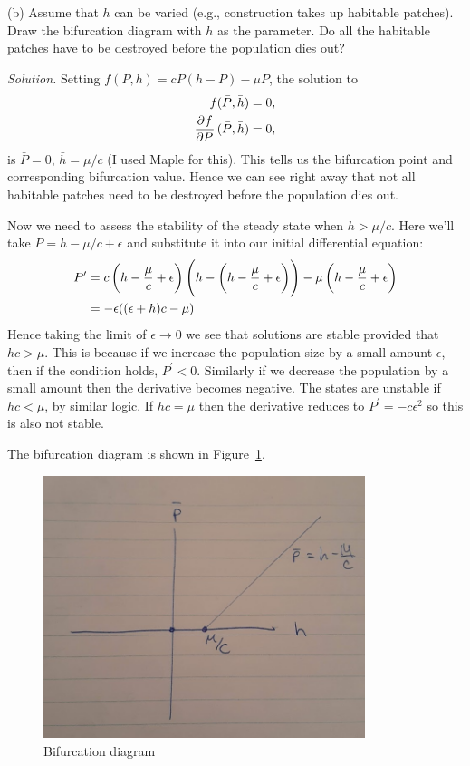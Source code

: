 \documentclass{article}
\begin{document}
\vspace{5mm}

(b) Assume that $h$ can be varied (e.g., construction takes up habitable
patches). Draw the bifurcation diagram with $h$ as the parameter. Do all
the habitable patches have to be destroyed before the population dies
out?

\textit{Solution.}
Setting $f(P, h) = c P (h - P) - \mu P$, the solution to
%
\begin{align*}
    f(\bar{P}, \bar{h}) &= 0, \\
    \dpd{f}{P}(\bar{P}, \bar{h}) &= 0,
\end{align*}
%
is $\bar{P} = 0$, $\bar{h} = \mu / c$ (I used Maple for this).
This tells us the bifurcation point and corresponding bifurcation value.
Hence we can see right away that not all habitable patches need to be destroyed
before the population dies out.

Now we need to assess the stability of the steady state when $h > \mu /
c$. Here we'll take $P = h - \mu / c + \epsilon$ and substitute it into
our initial differential equation:
%
\begin{align*}
    P^\prime
        &=
        c \del{h - \frac{\mu}{c}+ \epsilon}
        \del{h - \del{h - \frac{\mu}{c} + \epsilon}}
        - \mu \del{h - \frac{\mu}{c} + \epsilon} \\
        &= - \epsilon ((\epsilon + h) c - \mu)
\end{align*}
%
Hence taking the limit of $\epsilon \to 0$ we see that solutions are
stable provided that $h c > \mu$. This is because if we increase the
population size by a small amount $\epsilon$, then if the condition
holds, $P^\prime < 0$. Similarly if we decrease the population by a
small amount then the derivative becomes negative. The states are
unstable if $hc < \mu$, by similar logic. If $hc = \mu$ then
the derivative reduces to $P^\prime = - c \epsilon^2$ so this is
also not stable.

The bifurcation diagram is shown in Figure~\ref{fig:395}.

\begin{figure}[!ht]
    \includegraphics[width=3.7in]{q395}
    \centering
    \caption{Bifurcation diagram}
    \label{fig:395}
\end{figure}
\end{document}

